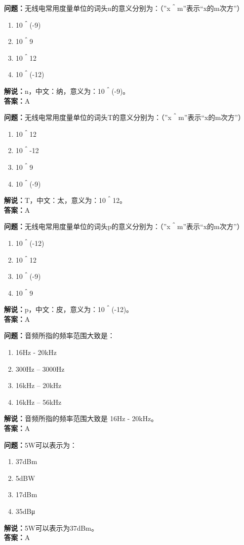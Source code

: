 \documentclass[UTF8]{ctexbook}
\begin{document}
\textbf{问题：}无线电常用度量单位的词头n的意义分别为：（”x＾m”表示“x的m次方”）
\begin{enumerate}[label=\Alph*), leftmargin=3em]
  \item 10＾(-9)
  \item 10＾9
  \item 10＾12
  \item 10＾(-12)
\end{enumerate}
\textbf{解说：}n，中文：纳，意义为：10＾(-9)。\\
\textbf{答案：}A

\textbf{问题：}无线电常用度量单位的词头T的意义分别为：（”x＾m”表示“x的m次方”）
\begin{enumerate}[label=\Alph*), leftmargin=3em]
  \item 10＾12
  \item 10＾-12
  \item 10＾9
  \item 10＾(-9)
\end{enumerate}
\textbf{解说：}T，中文：太，意义为：10＾12。\\
\textbf{答案：}A

\textbf{问题：}无线电常用度量单位的词头p的意义分别为：（”x＾m”表示“x的m次方”）
\begin{enumerate}[label=\Alph*), leftmargin=3em]
  \item 10＾(-12)
  \item 10＾12
  \item 10＾(-9)
  \item 10＾9
\end{enumerate}
\textbf{解说：}p，中文：皮，意义为：10＾(-12)。\\
\textbf{答案：}A

\textbf{问题：}音频所指的频率范围大致是：
\begin{enumerate}[label=\Alph*), leftmargin=3em]
  \item 16Hz - 20kHz
  \item 300Hz – 3000Hz
  \item 16kHz – 20kHz
  \item 16kHz – 56kHz
\end{enumerate}
\textbf{解说：}音频所指的频率范围大致是 16Hz - 20kHz。\\  %
\textbf{答案：}A

\textbf{问题：}5W可以表示为：
\begin{enumerate}[label=\Alph*), leftmargin=3em]
  \item 37dBm
  \item 5dBW
  \item 17dBm
  \item 35dBμ
\end{enumerate}
\textbf{解说：}5W可以表示为37dBm。\\
\textbf{答案：}A
\end{document}

